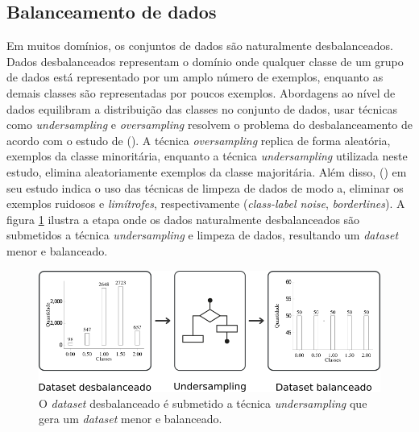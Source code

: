 \subsection{Balanceamento de dados}
\label{subsection:balanceamento_dados}

Em muitos domínios, os conjuntos de dados são naturalmente desbalanceados. 
Dados desbalanceados representam o domínio onde qualquer classe de um grupo 
de dados está representado por um amplo número de exemplos, enquanto as demais 
classes são representadas por poucos exemplos. Abordagens ao nível de dados 
equilibram a distribuição das classes no conjunto de dados, usar técnicas como 
\textit{undersampling} e \textit{oversampling} resolvem o problema do 
desbalanceamento de acordo com o estudo de  
(\citeyear{ferreiraestudo}). A técnica \textit{oversampling} replica de forma 
aleatória, exemplos da classe minoritária, enquanto a técnica 
\textit{undersampling} utilizada neste estudo, elimina aleatoriamente exemplos 
da classe majoritária. Além disso,  
(\citeyear{machado2009estudo}) em seu estudo indica o uso das técnicas de 
limpeza de dados de modo a, eliminar os exemplos ruidosos e \textit{limítrofes}, 
respectivamente (\textit{class-label noise}, \textit{borderlines}). A figura 
\ref{figure:metodologia_2} ilustra a etapa onde os dados naturalmente 
desbalanceados são submetidos a técnica \textit{undersampling} e limpeza de 
dados, resultando um \textit{dataset} menor e balanceado.

\begin{figure}[H]
\begin{center}
    \includegraphics[scale=0.70]{images/metodologia_2.png}
\end{center}
\caption{O \textit{dataset} desbalanceado é submetido a técnica
\textit{undersampling} que gera um \textit{dataset} menor e balanceado.}
\label{figure:metodologia_2}
\end{figure}



